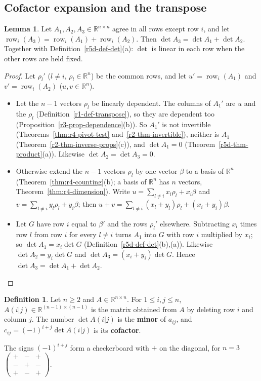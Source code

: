 \documentclass[12pt]{article}
\newcommand{\R}{\mathbb R}
\DeclareMathOperator{\row}{row}
\theoremstyle{definition}
\newtheorem{lemma}[theorem]{Lemma}
\newtheorem{definition}[theorem]{Definition}
\begin{document}
\subsection*{Cofactor expansion and the transpose}

\begin{lemma}\label{r5d-lem-multilinear}
Let \(A_1,A_2,A_3\in\R^{n\times n}\) agree in all rows except row \(i\), and let \(\row_i(A_3)=\row_i(A_1)+\row_i(A_2)\).
Then \(\det A_3=\det A_1+\det A_2\). Together with Definition~\ref{r5d-def-det}(a): \(\det\) is linear in each row when
the other rows are held fixed.
\end{lemma}
\begin{proof}
Let \(\rho_l'\) (\(l\ne i\), \(\rho_l\in\R^n\)) be the common rows, and let \(u'=\row_i(A_1)\) and \(v'=\row_i(A_2)\)
(\(u,v\in\R^n\)).
\begin{itemize}
\item Let the \(n-1\) vectors \(\rho_l\) be linearly dependent. The columns of \(A_1'\) are \(u\) and the \(\rho_l\)
(Definition~\ref{r1-def-transpose}), so they are dependent too (Proposition~\ref{r3-prop-dependence}(b)). So \(A_1'\) is
not invertible (Theorems~\ref{thm:r4-pivot-test} and~\ref{r2-thm-invertible}), neither is \(A_1\)
(Theorem~\ref{r2-thm-inverse-props}(c)), and \(\det A_1=0\) (Theorem~\ref{r5d-thm-product}(a)). Likewise
\(\det A_2=\det A_3=0\).
\item Otherwise extend the \(n-1\) vectors \(\rho_l\) by one vector \(\beta\) to a basis of \(\R^n\)
(Theorem~\ref{thm:r4-counting}(b); a basis of \(\R^n\) has \(n\) vectors, Theorem~\ref{thm:r4-dimension}). Write
\(u=\sum_{l\ne i}x_l\rho_l+x_i\beta\) and \(v=\sum_{l\ne i}y_l\rho_l+y_i\beta\); then
\(u+v=\sum_{l\ne i}(x_l+y_l)\rho_l+(x_i+y_i)\beta\).
\item Let \(G\) have row \(i\) equal to \(\beta'\) and the rows \(\rho_l'\) elsewhere. Subtracting \(x_l\) times row \(l\)
from row \(i\) for every \(l\ne i\) turns \(A_1\) into \(G\) with row \(i\) multiplied by \(x_i\); so
\(\det A_1=x_i\det G\) (Definition~\ref{r5d-def-det}(b),(a)). Likewise \(\det A_2=y_i\det G\) and
\(\det A_3=(x_i+y_i)\det G\). Hence \(\det A_3=\det A_1+\det A_2\).\qedhere
\end{itemize}
\end{proof}

\begin{definition}\label{r5d-def-cofactor}
Let \(n\geqslant2\) and \(A\in\R^{n\times n}\). For \(1\leqslant i,j\leqslant n\), \(A(i|j)\in\R^{(n-1)\times(n-1)}\) is the
matrix obtained from \(A\) by deleting row \(i\) and column \(j\). The number \(\det A(i|j)\) is the \textbf{minor}
of \(a_{ij}\), and \(c_{ij}=(-1)^{i+j}\det A(i|j)\) is its \textbf{cofactor}.
\end{definition}
The signs \((-1)^{i+j}\) form a checkerboard with \(+\) on the diagonal, for \(n=3\)
\(\left(\begin{smallmatrix}+&-&+\\-&+&-\\+&-&+\end{smallmatrix}\right)\).
\end{document}
